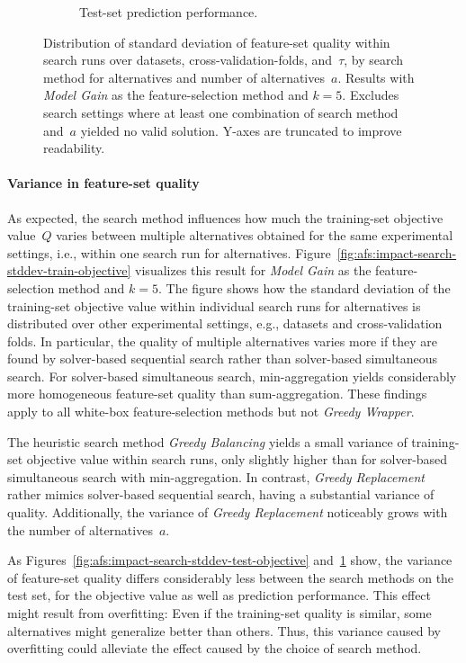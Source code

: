 \documentclass{article}
\theoremstyle{definition}
\begin{document}
\begin{figure}[p]
\begin{subfigure}[t]{\textwidth}
		\caption{Test-set prediction performance.}
		\label{fig:afs:impact-search-stddev-decision-tree-test-mcc}
	\end{subfigure}
	\caption{
		Distribution of standard deviation of feature-set quality within search runs over datasets, cross-validation-folds, and~$\tau$, by search method for alternatives and number of alternatives~$a$.
		Results with \emph{Model Gain} as the feature-selection method and $k=5$.
		Excludes search settings where at least one combination of search method and~$a$ yielded no valid solution.
		Y-axes are truncated to improve readability.
	}
	\label{fig:afs:impact-search-stddev-quality}
\end{figure}

\paragraph{Variance in feature-set quality}

As expected, the search method influences how much the training-set objective value~$Q$ varies between multiple alternatives obtained for the same experimental settings, i.e., within one search run for alternatives.
Figure~\ref{fig:afs:impact-search-stddev-train-objective} visualizes this result for \emph{Model Gain} as the feature-selection method and $k=5$.
The figure shows how the standard deviation of the training-set objective value within individual search runs for alternatives is distributed over other experimental settings, e.g., datasets and cross-validation folds.
In particular, the quality of multiple alternatives varies more if they are found by solver-based sequential search rather than solver-based simultaneous search.
For solver-based simultaneous search, min-aggregation yields considerably more homogeneous feature-set quality than sum-aggregation.
These findings apply to all white-box feature-selection methods but not \emph{Greedy Wrapper}.

The heuristic search method \emph{Greedy Balancing} yields a small variance of training-set objective value within search runs, only slightly higher than for solver-based simultaneous search with min-aggregation.
In contrast, \emph{Greedy Replacement} rather mimics solver-based sequential search, having a substantial variance of quality.
Additionally, the variance of \emph{Greedy Replacement} noticeably grows with the number of alternatives~$a$.

As Figures~\ref{fig:afs:impact-search-stddev-test-objective} and~\ref{fig:afs:impact-search-stddev-decision-tree-test-mcc} show, the variance of feature-set quality differs considerably less between the search methods on the test set, for the objective value as well as prediction performance.
This effect might result from overfitting:
Even if the training-set quality is similar, some alternatives might generalize better than others.
Thus, this variance caused by overfitting could alleviate the effect caused by the choice of search method.
\end{document}
